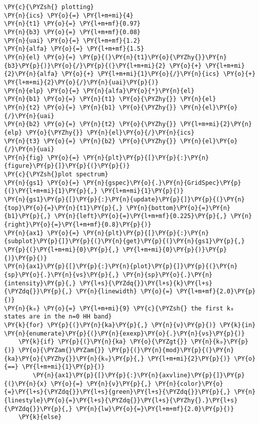 \begin{Verbatim}[commandchars=\\\{\}]
\PY{c}{\PYZsh{} plotting}
\PY{n}{ics} \PY{o}{=} \PY{l+m+mi}{4}
\PY{n}{t1} \PY{o}{=} \PY{l+m+mf}{0.97}
\PY{n}{b3} \PY{o}{=} \PY{l+m+mf}{0.08}
\PY{n}{uai} \PY{o}{=} \PY{l+m+mf}{1.2}
\PY{n}{alfa} \PY{o}{=} \PY{l+m+mf}{1.5}
\PY{n}{el} \PY{o}{=} \PY{p}{(}\PY{n}{t1}\PY{o}{\PYZhy{}}\PY{n}{b3}\PY{p}{)}\PY{o}{/}\PY{p}{(}\PY{l+m+mi}{2} \PY{o}{+} \PY{l+m+mi}{2}\PY{n}{alfa} \PY{o}{+} \PY{l+m+mi}{1}\PY{o}{/}\PY{n}{ics} \PY{o}{+} \PY{l+m+mi}{2}\PY{o}{/}\PY{n}{uai}\PY{p}{)}
\PY{n}{elp} \PY{o}{=} \PY{n}{alfa}\PY{o}{*}\PY{n}{el}
\PY{n}{b1} \PY{o}{=} \PY{n}{t1} \PY{o}{\PYZhy{}} \PY{n}{el}
\PY{n}{t2} \PY{o}{=} \PY{n}{b1} \PY{o}{\PYZhy{}} \PY{n}{el}\PY{o}{/}\PY{n}{uai}
\PY{n}{b2} \PY{o}{=} \PY{n}{t2} \PY{o}{\PYZhy{}} \PY{l+m+mi}{2}\PY{n}{elp} \PY{o}{\PYZhy{}} \PY{n}{el}\PY{o}{/}\PY{n}{ics}
\PY{n}{t3} \PY{o}{=} \PY{n}{b2} \PY{o}{\PYZhy{}} \PY{n}{el}\PY{o}{/}\PY{n}{uai}
\PY{n}{fig} \PY{o}{=} \PY{n}{plt}\PY{p}{[}\PY{p}{:}\PY{n}{figure}\PY{p}{]}\PY{p}{(}\PY{p}{)}
\PY{c}{\PYZsh{}plot spectrum}
\PY{n}{gs1} \PY{o}{=} \PY{n}{gspec}\PY{o}{.}\PY{n}{GridSpec}\PY{p}{(}\PY{l+m+mi}{1}\PY{p}{,} \PY{l+m+mi}{1}\PY{p}{)}
\PY{n}{gs1}\PY{p}{[}\PY{p}{:}\PY{n}{update}\PY{p}{]}\PY{p}{(}\PY{n}{top}\PY{o}{=}\PY{n}{t1}\PY{p}{,} \PY{n}{bottom}\PY{o}{=}\PY{n}{b1}\PY{p}{,} \PY{n}{left}\PY{o}{=}\PY{l+m+mf}{0.225}\PY{p}{,} \PY{n}{right}\PY{o}{=}\PY{l+m+mf}{0.8}\PY{p}{)}
\PY{n}{ax1} \PY{o}{=} \PY{n}{plt}\PY{p}{[}\PY{p}{:}\PY{n}{subplot}\PY{p}{]}\PY{p}{(}\PY{n}{get}\PY{p}{(}\PY{n}{gs1}\PY{p}{,} \PY{p}{(}\PY{l+m+mi}{0}\PY{p}{,} \PY{l+m+mi}{0}\PY{p}{)}\PY{p}{)}\PY{p}{)}
\PY{n}{ax1}\PY{p}{[}\PY{p}{:}\PY{n}{plot}\PY{p}{]}\PY{p}{(}\PY{n}{sp}\PY{o}{.}\PY{n}{νs}\PY{p}{,} \PY{n}{sp}\PY{o}{.}\PY{n}{intensity}\PY{p}{,} \PY{l+s}{\PYZdq{}}\PY{l+s}{k}\PY{l+s}{\PYZdq{}}\PY{p}{,} \PY{n}{linewidth} \PY{o}{=} \PY{l+m+mf}{2.0}\PY{p}{)}
\PY{n}{k₀} \PY{o}{=} \PY{l+m+mi}{9} \PY{c}{\PYZsh{} the first k₀ states are in the n=0 HH band}
\PY{k}{for} \PY{p}{(}\PY{n}{ka}\PY{p}{,} \PY{n}{ν}\PY{p}{)} \PY{k}{in} \PY{n}{enumerate}\PY{p}{(}\PY{n}{exexp}\PY{o}{.}\PY{n}{νs}\PY{p}{)}
    \PY{k}{if} \PY{p}{(}\PY{n}{ka} \PY{o}{\PYZgt{}} \PY{n}{k₀}\PY{p}{)} \PY{o}{\PYZam{}\PYZam{}} \PY{p}{(}\PY{n}{mod}\PY{p}{(}\PY{n}{ka}\PY{o}{\PYZhy{}}\PY{n}{k₀}\PY{p}{,} \PY{l+m+mi}{2}\PY{p}{)} \PY{o}{==} \PY{l+m+mi}{1}\PY{p}{)}
        \PY{n}{ax1}\PY{p}{[}\PY{p}{:}\PY{n}{axvline}\PY{p}{]}\PY{p}{(}\PY{n}{x} \PY{o}{=} \PY{n}{ν}\PY{p}{,} \PY{n}{color}\PY{o}{=}\PY{l+s}{\PYZdq{}}\PY{l+s}{green}\PY{l+s}{\PYZdq{}}\PY{p}{,} \PY{n}{linestyle}\PY{o}{=}\PY{l+s}{\PYZdq{}}\PY{l+s}{\PYZhy{}.}\PY{l+s}{\PYZdq{}}\PY{p}{,} \PY{n}{lw}\PY{o}{=}\PY{l+m+mf}{2.0}\PY{p}{)}
    \PY{k}{else}

\end{Verbatim}
